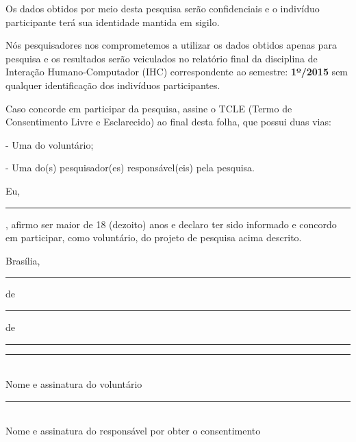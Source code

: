 Os dados obtidos por meio desta pesquisa serão confidenciais e o indivíduo participante terá sua identidade mantida em sigilo.

Nós pesquisadores nos comprometemos a utilizar os dados obtidos apenas para pesquisa e os resultados serão veiculados no relatório final da disciplina de Interação Humano-Computador (IHC) correspondente ao semestre: \textbf{1º/2015} sem qualquer
identificação dos indivíduos participantes.

Caso concorde em participar da pesquisa, assine o TCLE (Termo de Consentimento Livre e Esclarecido) ao final desta folha, que possui duas vias:

- Uma do voluntário;

- Uma do(s) pesquisador(es) responsável(eis) pela pesquisa.

\vspace{0.5cm}

Eu, \rule{8cm}{0.5pt}, afirmo ser maior de 18 (dezoito) anos e declaro ter sido informado e concordo em participar, como voluntário, do projeto de pesquisa acima descrito.


\raggedleft
Brasília,\rule{1cm}{0.5pt}de\rule{1cm}{0.5pt}de\rule{1cm}{0.5pt}

\vspace{1cm}

\centering
\rule{10cm}{0.5pt}\\
Nome e assinatura do voluntário\\

\vspace{1cm}

\centering
\rule{10cm}{0.5pt}\\
Nome e assinatura do responsável por obter o consentimento

